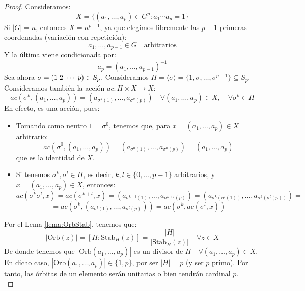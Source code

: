 \documentclass[12pt]{article}
\newcommand{\Stab}{\text{Stab}}
\newcommand{\Orb}{\text{Orb}}
\begin{document}
\begin{ejercicio}
        \begin{proof}
            Consideramos:
            $$X = \{(a_1, \ldots, a_p) \in G^{p} : a_1 \cdots a_p = 1\}$$
            Si $|G| = n$, entonces $X = n^{p-1}$, ya que elegimos libremente las $p-1$ primeras coordenadas (variación con repetición):
            $$a_1, \ldots, a_{p-1} \in G \quad \text{arbitrarios}$$
            Y la última viene condicionada por:
            $$a_p = (a_1, \ldots, a_{p-1})^{-1}$$
            Sea ahora $\sigma = (1 \hspace{0.1cm} 2 \hspace{0.1cm} \cdots \hspace{0.1cm} p) \in S_p$. Consideramos $H = \langle \sigma \rangle = \{1, \sigma, \ldots, \sigma^{p-1}\} \subseteq S_p$. Consideramos también la acción $ac : H \times X \to X$:
            $$ac(\sigma^{k}, (a_1, \ldots, a_p)) = (a_{\sigma^{k}(1)}, \ldots, a_{\sigma^{k}(p)}) \quad \forall(a_1,\ldots,a_p) \in X, \quad \forall \sigma^{k} \in H$$
            En efecto, es una acción, pues:
            \begin{itemize}
                \item Tomando como neutro $1 = \sigma^{0}$, tenemos que, para $x = (a_1, \ldots, a_p) \in X$ arbitrario: $$ac(\sigma^{0}, (a_1, \ldots, a_p)) = (a_{\sigma^{0}(1)}, \ldots, a_{\sigma^{0}(p)}) = (a_1, \ldots, a_p)$$ que es la identidad de $X$.
                \item Si tenemos $\sigma^{k}, \sigma^{l} \in H$, es decir, $k,l \in \{0, \ldots, p-1\}$ arbitrarios, y $x=(a_1, \ldots, a_p) \in X$, entonces:
                $$ac(\sigma^{k} \sigma^{l}, x) = ac(\sigma^{k+l}, x) = (a_{\sigma^{k+l}(1)}, \ldots, a_{\sigma^{k+l}(p)}) = (a_{\sigma^{k}(\sigma^{l}(1))}, \ldots, a_{\sigma^{k}(\sigma^{l}(p))}) = $$
                $$= ac(\sigma^{k}, (a_{\sigma^{l}(1)}, \ldots, a_{\sigma^{l}(p)})) = ac(\sigma^{k}, ac(\sigma^{l}, x))$$
            \end{itemize}
            Por el Lema \ref{lema:OrbStab}, tenemos que:
            $$|\Orb(z)| = [H : \Stab_H(z)] = \dfrac{|H|}{|\Stab_H(z)|} \quad \forall z \in X$$
            De donde tenemos que $|\Orb(a_1, \ldots, a_p)|$ es un divisor de $H \quad \forall (a_1, \ldots, a_p) \in X$. En dicho caso, $|\Orb(a_1, \ldots, a_p)| \in \{1,p\}$, por ser $|H| = p$ (y ser $p$ primo). Por tanto, las órbitas de un elemento serán unitarias o bien tendrán cardinal $p$. \\


\end{proof}
\end{ejercicio}
\end{document}
